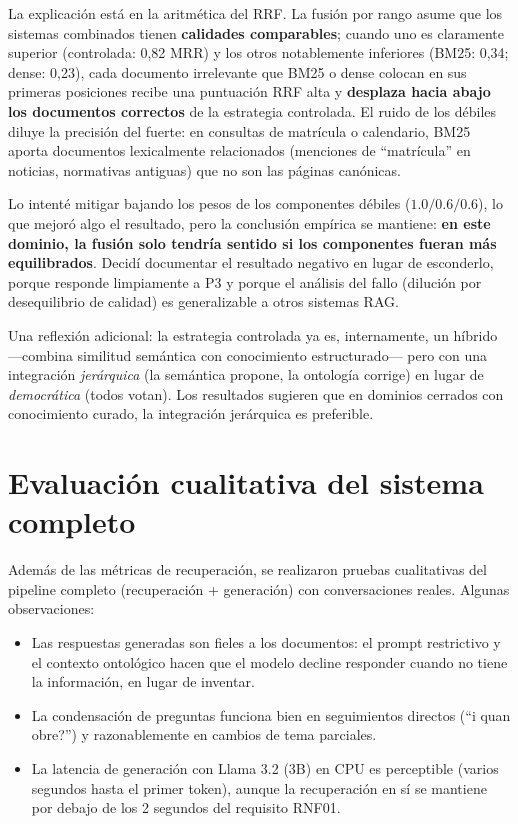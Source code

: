 \documentclass[12pt, a4paper, twoside]{report}
\begin{document}
La explicaci\'on est\'a en la aritm\'etica del RRF. La fusi\'on por rango asume que los sistemas combinados tienen \textbf{calidades comparables}; cuando uno es claramente superior (controlada: 0,82 MRR) y los otros notablemente inferiores (BM25: 0,34; dense: 0,23), cada documento irrelevante que BM25 o dense colocan en sus primeras posiciones recibe una puntuaci\'on RRF alta y \textbf{desplaza hacia abajo los documentos correctos} de la estrategia controlada. El ruido de los d\'ebiles diluye la precisi\'on del fuerte: en consultas de matr\'icula o calendario, BM25 aporta documentos lexicalmente relacionados (menciones de ``matr\'icula'' en noticias, normativas antiguas) que no son las p\'aginas can\'onicas.

Lo intent\'e mitigar bajando los pesos de los componentes d\'ebiles ($1.0/0.6/0.6$), lo que mejor\'o algo el resultado, pero la conclusi\'on emp\'irica se mantiene: \textbf{en este dominio, la fusi\'on solo tendr\'ia sentido si los componentes fueran m\'as equilibrados}. Decid\'i documentar el resultado negativo en lugar de esconderlo, porque responde limpiamente a P3 y porque el an\'alisis del fallo (diluci\'on por desequilibrio de calidad) es generalizable a otros sistemas RAG.

Una reflexi\'on adicional: la estrategia controlada ya es, internamente, un h\'ibrido ---combina similitud sem\'antica con conocimiento estructurado--- pero con una integraci\'on \textit{jer\'arquica} (la sem\'antica propone, la ontolog\'ia corrige) en lugar de \textit{democr\'atica} (todos votan). Los resultados sugieren que en dominios cerrados con conocimiento curado, la integraci\'on jer\'arquica es preferible.

\section{Evaluaci\'on cualitativa del sistema completo}

Adem\'as de las m\'etricas de recuperaci\'on, se realizaron pruebas cualitativas del pipeline completo (recuperaci\'on + generaci\'on) con conversaciones reales. Algunas observaciones:

\begin{itemize}
  \item Las respuestas generadas son fieles a los documentos: el prompt restrictivo y el contexto ontol\'ogico hacen que el modelo decline responder cuando no tiene la informaci\'on, en lugar de inventar.
  \item La condensaci\'on de preguntas funciona bien en seguimientos directos (``i quan obre?'') y razonablemente en cambios de tema parciales.
  \item La latencia de generaci\'on con Llama 3.2 (3B) en CPU es perceptible (varios segundos hasta el primer token), aunque la recuperaci\'on en s\'i se mantiene por debajo de los 2 segundos del requisito RNF01.
\end{itemize}
\end{document}
